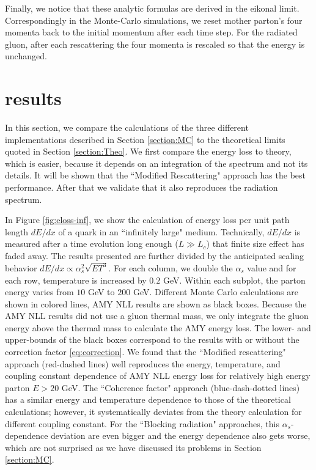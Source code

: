 \documentclass[aps, prc, reprint, amsmath, groupedaddress, nofootinbib]{revtex4-1}
\begin{document}
Finally, we notice that these analytic formulas are derived in the eikonal limit.
Correspondingly in the Monte-Carlo simulations, we reset mother parton's four momenta back to the initial momentum after each time step. 
For the radiated gluon, after each rescattering the four momenta is rescaled so that the energy is unchanged.


\section{results}\label{section:results}
In this section, we compare the calculations of the three different implementations described in Section \ref{section:MC} to the theoretical limits quoted in Section \ref{section:Theo}. 
We first compare the energy loss to theory, which is easier, because it depends on an integration of the spectrum and not its details.
It will be shown that the ``Modified Rescattering" approach has the best performance. 
After that we validate that it also reproduces the radiation spectrum.


In Figure \ref{fig:eloss-inf}, we show the calculation of energy loss per unit path length $dE/dx$ of a quark in an ``infinitely large" medium. 
Technically, $dE/dx$ is measured after a time evolution long enough ($L\gg L_c$) that finite size effect has faded away.
The results presented are further divided by the anticipated scaling behavior $dE/dx \propto \alpha_s^2 \sqrt{ET^3}$.
For each column, we double the $\alpha_s$ value and for each row, temperature is increased by $0.2$ GeV. 
Within each subplot, the parton energy varies from $10$ GeV to $200$ GeV.
Different Monte Carlo calculations are shown in colored lines, AMY NLL results are shown as black boxes. 
Because the AMY NLL results did not use a gluon thermal mass, we only integrate the gluon energy above the thermal mass to calculate the AMY energy loss. 
The lower- and upper-bounds of the black boxes correspond to the results with or without the correction factor \ref{eq:correction}.
We found that the ``Modified rescattering" approach (red-dashed lines) well reproduces the energy, temperature, and coupling constant dependence of AMY NLL energy loss for relatively high energy parton $E>20$ GeV.
The ``Coherence factor" approach (blue-dash-dotted lines) has a similar energy and temperature dependence to those of the theoretical calculations; however, it systematically deviates from the theory calculation for different coupling constant.
For the ``Blocking radiation" approaches, this $\alpha_s$-dependence deviation are even bigger and the energy dependence also gets worse, which are not surprised as we have discussed its problems in Section \ref{section:MC}.
\end{document}
